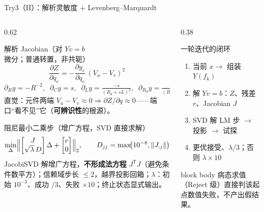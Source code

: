 \documentclass[UTF8,aspectratio=169,10pt]{ctexbeamer}
\begin{document}
\begin{frame}{Try3（II）：解析灵敏度 + Levenberg--Marquardt}
  \begin{columns}
    \begin{column}{0.62\textwidth}
      \begin{block}{解析 Jacobian（对 $Yv=b$ 微分；普通转置，非共轭）}
        {\small
        \[
          \frac{\partial Z}{\partial q_e}=-\frac{\partial y_e}{\partial q_e}\,(V_u-V_v)^{2}
        \]
        \[
          \partial_R y=-R^{-2},\;\;\partial_C y=s,\;\;
          \partial_L y=\tfrac{-s}{(R_d+sL)^2},\;\;\partial_{R_d} y=\tfrac{-1}{(R_d+sL)^2}
        \]}
        直觉：元件两端 $V_u-V_v\approx 0\Rightarrow \partial Z/\partial q\approx 0$——端口“看不见”它（\textbf{可辨识性}的根源）。
      \end{block}
      \begin{block}{阻尼最小二乘步（增广方程，SVD 直接求解）}
        {\small
        \[
          \min_{\Delta}\Bigl\|\begin{bmatrix} J\\ \sqrt{\lambda}\,D\end{bmatrix}\Delta+\begin{bmatrix} r\\ 0\end{bmatrix}\Bigr\|_2,
          \qquad D_{jj}=\max\!\bigl(10^{-8},\|J_{:j}\|\bigr)
        \]}
        JacobiSVD 解增广方程，\textbf{不形成法方程} $J^{\mathsf T}J$（避免条件数平方）；信赖域步长 $\le 2$，越界投影回箱；$\lambda$：初始 $10^{-3}$、成功 $/3$、失败 $\times 10$；终止状态显式输出。
      \end{block}
    \end{column}
    \begin{column}{0.38\textwidth}
      \begin{block}{一轮迭代的闭环}
        \begin{enumerate}
          \item 当前 $x\to$ 组装 $Y(f_k)$
          \item 解 $Yv=b$：$Z$、残差 $r$、Jacobian $J$
          \item SVD 解 LM 步 $\to$ 投影 $\to$ 试探
          \item 更优接受、$\lambda\!/3$；否则 $\lambda\times 10$
        \end{enumerate}
      \end{block}
      \vspace{0.8ex}
      \begin{beamercolorbox}[sep=4pt]{block body}
        病态求值（Reject 级）直接判该起点数值失败，不产出假结果。
      \end{beamercolorbox}
    \end{column}
  \end{columns}
\end{frame}
\end{document}
